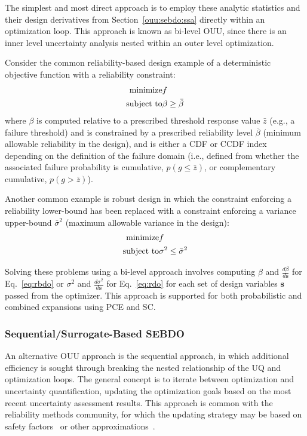 The simplest and most direct approach is to employ these analytic
statistics and their design derivatives from
Section~\ref{ouu:sebdo:ssa} directly within an optimization loop.
This approach is known as bi-level OUU, since there is an inner level
uncertainty analysis nested within an outer level optimization.

Consider the common reliability-based design example of a deterministic 
objective function with a reliability constraint:
\begin{eqnarray}
  {\rm minimize }     & f \nonumber \\
  {\rm subject \ to } & \beta \ge \bar{\beta} \label{eq:rbdo}
\end{eqnarray}
where $\beta$ is computed relative to a prescribed threshold response
value $\bar{z}$ (e.g., a failure threshold) and is constrained by a
prescribed reliability level $\bar{\beta}$ (minimum allowable
reliability in the design), and is either a CDF or CCDF index
depending on the definition of the failure domain (i.e., defined from
whether the associated failure probability is cumulative, $p(g \le
\bar{z})$, or complementary cumulative, $p(g > \bar{z})$).

Another common example is robust design in which the
constraint enforcing a reliability lower-bound has been replaced with
a constraint enforcing a variance upper-bound $\bar{\sigma}^2$ (maximum
allowable variance in the design):
\begin{eqnarray}
  {\rm minimize }     & f \nonumber \\
  {\rm subject \ to } & \sigma^2 \le \bar{\sigma}^2 \label{eq:rdo}
\end{eqnarray}

Solving these problems using a bi-level approach involves computing
$\beta$ and $\frac{d\beta}{d\boldsymbol{s}}$ for
Eq.~\ref{eq:rbdo} or $\sigma^2$ and $\frac{d\sigma^2}{d\boldsymbol{s}}$
for Eq.~\ref{eq:rdo} for each set of design variables $\boldsymbol{s}$
passed from the optimizer.  This approach is supported for both 
probabilistic and combined expansions using PCE and SC.

\subsubsection{Sequential/Surrogate-Based SEBDO} \label{ouu:sebdo:form:surr}

An alternative OUU approach is the sequential approach, in which
additional efficiency is sought through breaking the nested
relationship of the UQ and optimization loops.  The general concept is
to iterate between optimization and uncertainty quantification,
updating the optimization goals based on the most recent uncertainty
assessment results.  This approach is common with the reliability
methods community, for which the updating strategy may be based on
safety factors~\cite{Wu01} or other approximations~\cite{Du04}.


